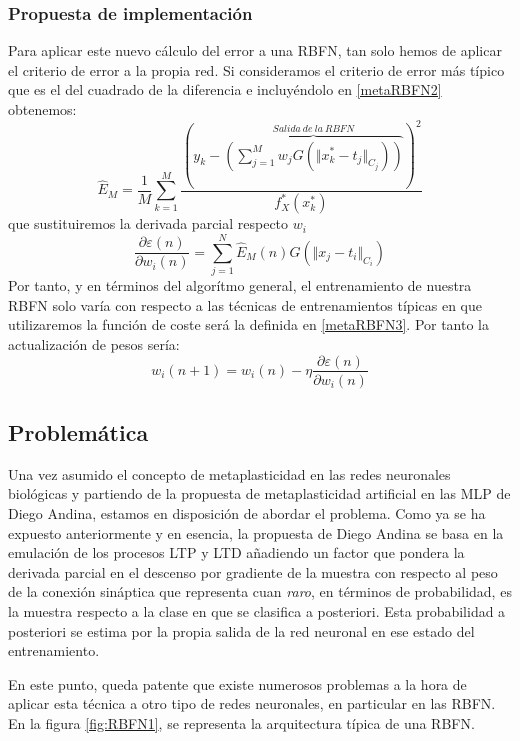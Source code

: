 \documentclass[10pt,a4paper]{report}
\begin{document}
\subsubsection{Propuesta de implementación}
Para aplicar este nuevo cálculo del error a una RBFN, tan solo hemos de aplicar el criterio de error a la propia red. Si consideramos el criterio de error más típico que es el del cuadrado de la diferencia e incluyéndolo en \ref{metaRBFN2} obtenemos:
\begin{equation}
	\label{metaRBFN3}
	\widehat{E}_M=\dfrac{1}{M}\sum^M_{k=1}\dfrac{(y_k - \overbrace{\left(\sum^M_{j=1}{w_j G(\Vert x^*_k - t_j \Vert_{C_j})}\right)}^{Salida\ de\ la\ RBFN})^2}{f^*_X(x^*_k)}
\end{equation}
que sustituiremos la derivada parcial respecto $w_i$
\begin{equation}
	\dfrac{\partial\varepsilon(n)}{\partial w_i(n)} = \sum^N_{j=1}{\widehat{E}_M(n) G(\Vert x_j - t_i \Vert_{C_i})}
\end{equation}
Por tanto, y en términos del algorítmo general, el entrenamiento de nuestra RBFN solo varía con respecto a las técnicas de entrenamientos típicas en que utilizaremos la función de coste será la definida en \ref{metaRBFN3}. Por tanto la actualización de pesos sería:
\begin{equation}
	w_i(n+1)=w_i(n) - \eta \dfrac{\partial\varepsilon(n)}{\partial w_i(n)}
\end{equation}

\subsection{Problemática}
Una vez asumido el concepto de metaplasticidad en las redes neuronales biológicas y partiendo de la propuesta de metaplasticidad artificial en las MLP de Diego Andina, estamos en disposición de abordar el problema. 
Como ya se ha expuesto anteriormente y en esencia, la propuesta de Diego Andina se basa en la emulación de los procesos LTP y LTD añadiendo un factor que pondera la derivada parcial en el descenso por gradiente de la muestra con respecto al peso de la conexión sináptica que representa cuan \textit{raro}, en términos de probabilidad, es la muestra respecto a la clase en que se clasifica a posteriori. Esta probabilidad a posteriori se estima por la propia salida de la red neuronal en ese estado del entrenamiento. 

En este punto, queda patente que existe numerosos problemas a la hora de aplicar esta técnica a otro tipo de redes neuronales, en particular en las RBFN. En la figura \ref{fig:RBFN1}, se representa la arquitectura típica de una RBFN.
\end{document}
